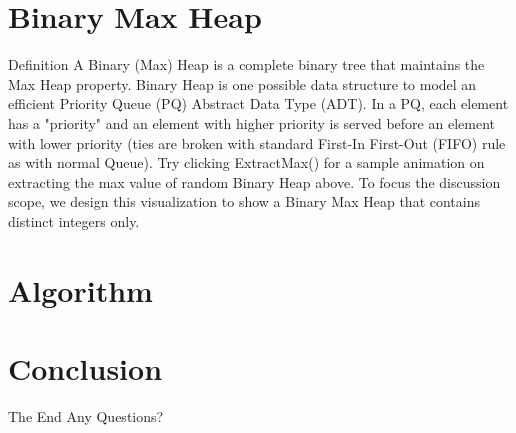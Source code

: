 \documentclass{beamer}
\begin{document}
\section{Binary Max Heap}
\begin{frame}{Definition}
  A Binary (Max) Heap is a complete binary tree that maintains the Max Heap property.
  Binary Heap is one possible data structure to model an efficient Priority Queue (PQ) Abstract Data Type (ADT). In a PQ, each element has a "priority" and an element with higher priority is served before an element with lower priority (ties are broken with standard First-In First-Out (FIFO) rule as with normal Queue). Try clicking ExtractMax() for a sample animation on extracting the max value of random Binary Heap above.
  To focus the discussion scope, we design this visualization to show a Binary Max Heap that contains distinct integers only.
\end{frame}


\section{Algorithm}



\section{Conclusion}
\begin{frame}{The End}
    Any Questions?
\end{frame}
\end{document}

